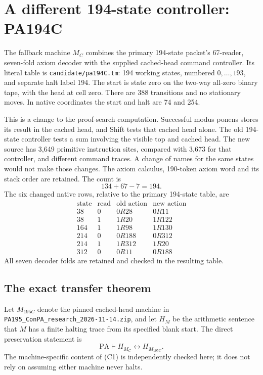 \section{A different 194-state controller: PA194C}
\label{sec:pa194c}

The fallback machine $M_C$ combines the primary 194-state packet's
67-reader, seven-fold axiom decoder with the supplied cached-head command
controller. Its literal table is \texttt{candidate/pa194C.tm}: 194 working
states, numbered $0,\ldots,193$, and separate halt label 194. The start is
state zero on the two-way all-zero binary tape, with the head at cell zero.
There are 388 transitions and no stationary moves. In native coordinates
the start and halt are 74 and 254.

This is a change to the proof-search computation. Successful modus ponens
stores its result in the cached head, and Shift tests that cached head
alone. The old 194-state controller tests a sum involving the visible top
and cached head. The new source has 3,649 primitive instruction sites,
compared with 3,673 for that controller, and different command traces.
A change of names for the same states would not make those changes.
The axiom calculus, 190-token axiom word and its stack order are retained.
The count is
\[
                  134+67-7=194.
\]
The six changed native rows, relative to the primary 194-state table, are
\[
\begin{array}{rr|l|l}
 \text{state}&\text{read}&\text{old action}&\text{new action}\\\hline
 38&0&0R28&0R11\\
 38&1&1R20&1R122\\
 164&1&1R98&1R130\\
 214&0&0R188&0R312\\
 214&1&1R312&1R20\\
 312&0&0R11&0R188
\end{array}
\]
All seven decoder folds are retained and checked in the resulting table.

\subsection{The exact transfer theorem}

Let $M_{195C}$ denote the pinned cached-head machine in
\texttt{PA195\_ConPA\_research\_2026-11-14.zip}, and let $H_M$ be the
arithmetic sentence that $M$ has a finite halting trace from its specified
blank start. The direct preservation statement is
\[
             \mathrm{PA}\vdash H_{M_C}\leftrightarrow H_{M_{195C}}.
\tag{C1}
\]
The machine-specific content of (C1) is independently checked here;
it does not rely on assuming either machine never halts.

